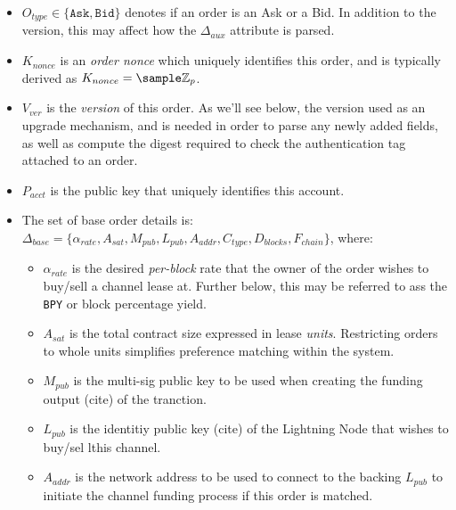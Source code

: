 \documentclass[12pt,a4paper]{article}
\theoremstyle{definition}
\begin{document}
\begin{itemize}
    \item $O_{type} \in \{\texttt{Ask}, \texttt{Bid}\}$ denotes if an order is
        an Ask or a Bid. In addition to the version, this may affect how the
        $\Delta_{aux}$ attribute is parsed.

    \item $K_{nonce}$ is an \emph{order nonce} which uniquely identifies this
        order, and is typically derived as $K_{nonce} = \sample
        \mathbb{Z}_{p}$.

    \item $V_{ver}$ is the \emph{version} of this order. As we'll see below,
        the version used as an upgrade mechanism, and is needed in order to
        parse any newly added fields, as well as compute the digest required to
        check the authentication tag attached to an order.

    \item $P_{acct}$ is the public key that uniquely identifies this account.

    \item The set of base order details is: \\ $\Delta_{base} = \{
        \alpha_{rate}, A_{sat}, M_{pub}, L_{pub}, A_{addr}, C_{type},
    D_{blocks}, F_{chain} \}$, where:

    \begin{itemize}

        \item $\alpha_{rate}$ is the desired \emph{per-block} rate that the owner
            of the order wishes to buy/sell a channel lease at. Further below, this
            may be referred to ass the \texttt{BPY} or block percentage yield.

        \item $A_{sat}$ is the total contract size expressed in lease \emph{units}.
            Restricting orders to whole units simplifies preference matching within
            the system.

        \item $M_{pub}$ is the multi-sig public key to be used when creating
            the funding output (cite) of the tranction. %

        \item $L_{pub}$ is the identitiy public key (cite) of the Lightning
            Node that wishes to buy/sel lthis channel.

        \item $A_{addr}$ is the network address to be used to connect to the
            backing $L_{pub}$ to initiate the channel funding process if this
            order is matched. %


\end{itemize}
\end{itemize}
\end{document}
